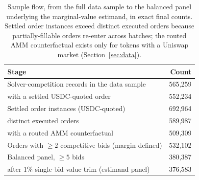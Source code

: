 \documentclass[11pt]{article}
\theoremstyle{plain}
\theoremstyle{definition}
\theoremstyle{remark}
\begin{document}
\begin{table}[t]
\centering
{\fontsize{10}{12}\selectfont
\begin{tabular}{lr}
\toprule
Stage & Count \\
\midrule
Solver-competition records in the data sample & 565{,}259 \\
\quad with a settled USDC-quoted order & 552{,}234 \\
Settled order instances (USDC-quoted) & 692{,}964 \\
\quad distinct executed orders & 589{,}987 \\
\quad with a routed AMM counterfactual & 509{,}309 \\
Orders with $\ge 2$ competitive bids (margin defined) & 532{,}102 \\
Balanced panel, $\ge 5$ bids & 380{,}387 \\
\quad after 1\% single-bid-value trim (estimand panel) & 376{,}583 \\
\bottomrule
\end{tabular}}
\caption{Sample flow, from the full data sample to the balanced panel underlying the marginal-value estimand, in exact final counts. Settled order instances exceed distinct executed orders because partially-fillable orders re-enter across batches; the routed AMM counterfactual exists only for tokens with a Uniswap market (Section~\ref{sec:data}).}
\label{tab:flow}
\end{table}
\end{document}
